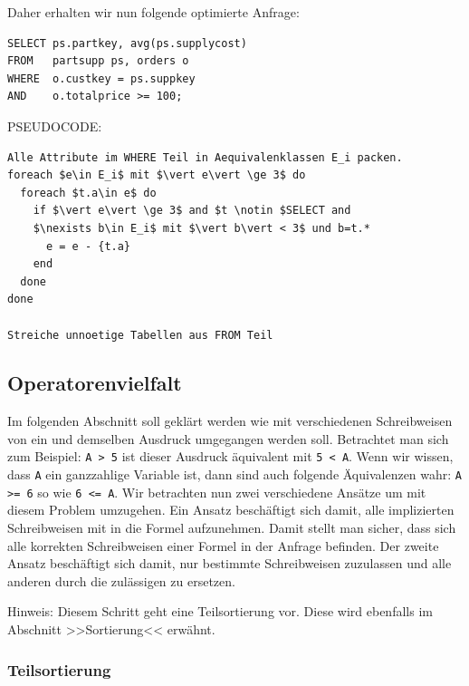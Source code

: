 Daher erhalten wir nun folgende optimierte Anfrage:
\begin{lstlisting}[mathescape]
SELECT ps.partkey, avg(ps.supplycost)
FROM   partsupp ps, orders o
WHERE  o.custkey = ps.suppkey 
AND    o.totalprice >= 100;
\end{lstlisting}

PSEUDOCODE:

\begin{lstlisting}[mathescape]
Alle Attribute im WHERE Teil in Aequivalenklassen E_i packen.
foreach $e\in E_i$ mit $\vert e\vert \ge 3$ do
  foreach $t.a\in e$ do
    if $\vert e\vert \ge 3$ and $t \notin $SELECT and 
    $\nexists b\in E_i$ mit $\vert b\vert < 3$ und b=t.*
      e = e - {t.a}
    end
  done
done

Streiche unnoetige Tabellen aus FROM Teil 
\end{lstlisting}

\subsection{Operatorenvielfalt}

Im folgenden Abschnitt soll geklärt werden wie mit verschiedenen Schreibweisen von ein und demselben Ausdruck umgegangen werden soll. Betrachtet man sich zum Beispiel: \verb|A > 5| ist dieser Ausdruck äquivalent mit \verb|5 < A|. Wenn wir wissen, dass \verb|A| ein ganzzahlige Variable ist, dann sind auch folgende Äquivalenzen wahr: \verb|A >= 6| so wie \verb|6 <= A|. Wir betrachten nun zwei verschiedene Ansätze um mit diesem Problem umzugehen. Ein Ansatz beschäftigt sich damit, alle implizierten Schreibweisen mit in die Formel aufzunehmen. Damit stellt man sicher, dass sich alle korrekten Schreibweisen einer Formel in der Anfrage befinden. Der zweite Ansatz beschäftigt sich damit, nur bestimmte Schreibweisen zuzulassen und alle anderen durch die zulässigen zu ersetzen.

Hinweis: Diesem Schritt geht eine Teilsortierung vor. Diese wird ebenfalls im Abschnitt >>Sortierung<< erwähnt. 

\subsubsection{Teilsortierung}

